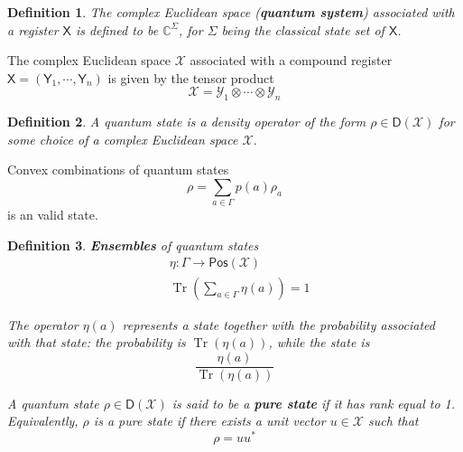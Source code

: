 \documentclass[aps,pra,onecolumn,notitlepage,superscriptaddress]{revtex4-1}
\newcommand{\C}{\mathbb{C}}
\newcommand{\reg}[1]{\mathsf{#1}}
\newcommand{\spc}[1]{\mathcal{#1}}
\newcommand{\Pos}{\mathsf{Pos}}
\newcommand{\D}{\mathsf{D}}
\newcommand{\Tr}{\operatorname{Tr}}
\newtheorem{defi}{Definition}
\begin{document}
    \begin{defi}
        The complex Euclidean space (\textbf{quantum system}) associated with a register $\reg X$ is defined to be $\C^\Sigma$, for $\Sigma$ being the classical state set of $\reg X$.
    \end{defi}

    The complex Euclidean space $\spc X$ associated with a compound register $\reg X = (\reg Y_1, \cdots, \reg Y_n)$ is given by the tensor product
    \begin{equation}
        \spc X = \spc Y_1 \otimes \cdots \otimes \spc Y_n
    \end{equation}

    \begin{defi}
        A quantum state is a density operator of the form $\rho \in \D(\spc X)$ for some choice of a complex Euclidean space $\spc X$.
    \end{defi}

    Convex combinations of quantum states
    \begin{equation}
        \rho = \sum_{a \in \Gamma} p(a) \rho_a
    \end{equation}
    is an valid state.

    \begin{defi}
        \textbf{Ensembles} of quantum states
        \begin{align}
            &\eta: \Gamma \to \Pos(\spc X) \\
            &\Tr \left( \sum_{a \in \Gamma} \eta(a) \right) = 1
        \end{align}

        The operator $\eta(a)$ represents a state together with the probability associated with that state: the probability is $\Tr(\eta(a))$, while the state is
        \begin{equation}
            \frac{\eta(a)}{\Tr(\eta(a))}
        \end{equation}

        A quantum state $\rho \in \D(\spc X)$ is said to be a \textbf{pure state} if it has rank equal to 1. Equivalently, $\rho$ is a pure state if there exists a unit vector $u \in \spc X$ such that
        \begin{equation}
            \rho = uu^*
        \end{equation}
    \end{defi}
\end{document}
